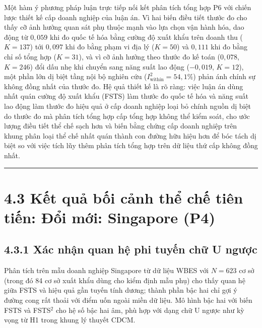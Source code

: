 \documentclass[
  a4paper,
  13pt]{extreport}
\begin{document}
Một hàm ý phương pháp luận trực tiếp nối kết phân tích tổng hợp P6 với
chiến lược thiết kế cấp doanh nghiệp của luận án. Vì hai biến điều tiết
thước đo cho thấy cỡ ảnh hưởng quan sát phụ thuộc mạnh vào lựa chọn vận
hành hóa, dao động từ \(0{,}059\) khi đo quốc tế hóa bằng cường độ xuất
khẩu trên doanh thu (\(K = 137\)) tới \(0{,}097\) khi đo bằng phạm vi
địa lý (\(K = 50\)) và \(0{,}111\) khi đo bằng chỉ số tổng hợp
(\(K = 31\)), và vì cỡ ảnh hưởng theo thước đo kế toán (\(0{,}078\),
\(K = 246\)) đổi dấu nhẹ khi chuyển sang năng suất lao động
(\(-0{,}019\), \(K = 12\)), một phần lớn dị biệt tầng nội bộ nghiên cứu
(\(I^2_{\text{within}} = 54{,}1\%\)) phản ánh chính sự không đồng nhất
của thước đo. Hệ quả thiết kế là rõ ràng: việc luận án dùng nhất quán
cường độ xuất khẩu (FSTS) làm thước đo quốc tế hóa và năng suất lao động
làm thước đo hiệu quả ở cấp doanh nghiệp loại bỏ chính nguồn dị biệt do
thước đo mà phân tích tổng hợp cấp tổng hợp không thể kiểm soát, cho ước
lượng điều tiết thể chế sạch hơn và biến bằng chứng cấp doanh nghiệp
trên khung phân loại thể chế nhất quán thành con đường hữu hiệu hơn để
bóc tách dị biệt so với việc tích lũy thêm phân tích tổng hợp trên dữ
liệu thứ cấp không đồng nhất.

\begin{center}\rule{0.5\linewidth}{0.5pt}\end{center}

\hypertarget{kux1ebft-quux1ea3-bux1ed1i-cux1ea3nh-thux1ec3-chux1ebf-tiuxean-tiux1ebfn-ux111ux1ed5i-mux1edbi-singapore-p4}{%
\section{4.3 Kết quả bối cảnh thể chế tiên tiến: Đổi mới: Singapore
(P4)}\label{kux1ebft-quux1ea3-bux1ed1i-cux1ea3nh-thux1ec3-chux1ebf-tiuxean-tiux1ebfn-ux111ux1ed5i-mux1edbi-singapore-p4}}

\hypertarget{xuxe1c-nhux1eadn-quan-hux1ec7-phi-tuyux1ebfn-chux1eef-u-ngux1b0ux1ee3c}{%
\subsection{4.3.1 Xác nhận quan hệ phi tuyến chữ U
ngược}\label{xuxe1c-nhux1eadn-quan-hux1ec7-phi-tuyux1ebfn-chux1eef-u-ngux1b0ux1ee3c}}

Phân tích trên mẫu doanh nghiệp Singapore từ dữ liệu WBES với
\(N = 623\) cơ sở (trong đó 84 cơ sở xuất khẩu dùng cho kiểm định mẫu
phụ) cho thấy quan hệ giữa FSTS và hiệu quả gần tuyến tính dương; thành
phần bậc hai chỉ gợi ý đường cong rất thoải với điểm uốn ngoài miền dữ
liệu. Mô hình bậc hai với biến FSTS và FSTS\(^2\) cho hệ số bậc hai âm,
phù hợp với dạng chữ U ngược như kỳ vọng từ H1 trong khung lý thuyết
CDCM.
\end{document}
